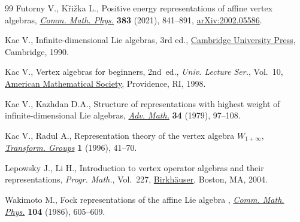 \documentclass[10pt,a4paper]{amsart}
\numberwithin{equation}{section}
\theoremstyle{definition}
\newcommand{\1}{\textbf{1}}
\begin{document}
\begin{thebibliography}{99}
Futorny V., K\v{r}i\v{z}ka L., Positive energy representations of affine vertex
 algebras, \href{https://doi.org/10.1007/s00220-020-03861-7}{\textit{Comm.
 Math. Phys.}} \textbf{383} (2021), 841--891,
 \href{http://arxiv.org/abs/2002.05586}{arXiv:2002.05586}.

Kac V., Infinite-dimensional {L}ie algebras, 3rd ed.,
 \href{https://doi.org/10.1017/CBO9780511626234}{Cambridge University Press},
 Cambridge, 1990.

Kac V., Vertex algebras for beginners, 2nd~ed., \textit{Univ. Lecture Ser.}, Vol.~10, \href{https://doi.org/10.1090/ulect/010}{American Mathematical
 Society}, Providence, RI, 1998.

Kac V., Kazhdan D.A., Structure of representations with highest weight of
 infinite-dimensional {L}ie algebras,
 \href{https://doi.org/10.1016/0001-8708(79)90066-5}{\textit{Adv. Math.}}
 \textbf{34} (1979), 97--108.

Kac V., Radul A., Representation theory of the vertex algebra {$W_{1+\infty}$},
 \href{https://doi.org/10.1007/BF02587735}{\textit{Transform. Groups}}
 \textbf{1} (1996), 41--70.

Lepowsky J., Li H., Introduction to vertex operator algebras and their
 representations, \textit{Progr. Math.}, Vol.~227,
 \href{https://doi.org/10.1007/978-0-8176-8186-9}{Birkh\"{a}user}, Boston, MA,
 2004.

Wakimoto M., Fock representations of the affine {L}ie algebra
 , \href{https://doi.org/10.1007/BF01211068}{\textit{Comm.
 Math. Phys.}} \textbf{104} (1986), 605--609.

\end{thebibliography}
\end{document}

